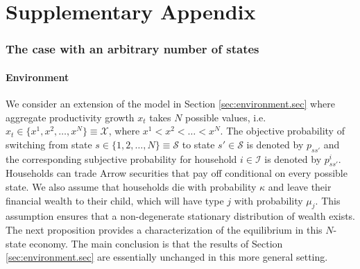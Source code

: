 
\clearpage
{}
\setcounter{table}{0}
\renewcommand{\thetable}{O.\arabic{table}}
\setcounter{figure}{0}
\renewcommand{\thefigure}{O.\arabic{figure}}
\setcounter{footnote}{0} 
\setcounter{proposition}{0}
\renewcommand{\theproposition}{O.\arabic{proposition}}
\appendix
\onehalfspacing
\part*{Supplementary Appendix}\label{OA_appendix}

\setcounter{page}{1}
\renewcommand{\thesection}{O\arabic{section}}
\section{The case with an arbitrary number of states}\label{app:Nstates}

\subsection{Environment}

We consider an extension of the model in Section \ref{sec:environment.sec} where aggregate productivity growth $x_{t}$ takes $N$ possible values, i.e. $x_t \in \{x^1, x^2, \ldots, x^N\} \equiv \mathcal{X}$, where $x^1 < x^2 < \ldots < x^N$.
The objective probability of switching from state $s \in\{1,2,\ldots, N\}\equiv \mathcal{S}$ to state $s'\in \mathcal{S}$ is denoted by $p_{ss'}$ and the corresponding subjective probability for household $i\in \mathcal{I}$ is denoted by $p_{ss'}^i$. 
Households can trade Arrow securities that pay off conditional on every possible state. 
We also assume that households die with probability $\kappa$ and leave their financial wealth to their child, which will have type $j$ with probability $\mu_j$. 
This assumption ensures that a non-degenerate stationary distribution of wealth exists.
The next proposition provides a characterization of the equilibrium in this $N$-state economy. The main conclusion is that the results of Section \ref{sec:environment.sec} are essentially unchanged in this more general setting.

